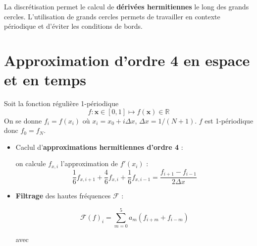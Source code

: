 \documentclass{sciposter}
\def\gsum{\displaystyle\sum\limits}
\begin{document}
\begin{multicols}{3}
\begin{figure}[htbp]
\begin{center}
\end{center}
\end{figure}

La discrétisation permet le calcul de \textbf{dérivées hermitiennes} le long des grands cercles. L'utilisation de grands cercles permets de travailler en contexte périodique et d'éviter les conditions de bords.

\vspace{2cm}

\section*{Approximation d'ordre 4 en espace et en temps}

Soit la fonction régulière 1-périodique
\begin{equation}
f : \mathbf{x} \in [0,1] \mapsto f(\mathbf{x}) \in \mathbb{R}
\end{equation}
On se donne $f_i = f(x_i)$ où $x_i = x_0 + i \Delta x$, $\Delta x=1/(N+1)$. $f$ est 1-périodique donc $f_0 = f_N$.

\begin{itemize}
\item Caclul d'\textbf{approximations hermitiennes d'ordre 4} :

on calcule $f_{x,i}$ l'approximation de $f'(x_i)$ :
\begin{equation}
\dfrac{1}{6} f_{x,i+1} + \dfrac{4}{6} f_{x,i} + \dfrac{1}{6} f_{x,i-1} = \dfrac{f_{i+1} - f_{i-1}}{2 \Delta x}
\end{equation}

\item \textbf{Filtrage} des hautes fréquences $\mathcal{F}$ :

\begin{equation}
\mathcal{F}(f)_i = \gsum_{m=0}^{5} a_m \left( f_{i+m} + f_{i-m} \right)
\end{equation}

avec 


\end{itemize}
\end{multicols}
\end{document}
